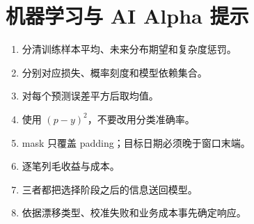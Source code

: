 \chapter{机器学习与 AI Alpha 提示}
\begin{enumerate}[leftmargin=*]
  \item 分清训练样本平均、未来分布期望和复杂度惩罚。
  \item 分别对应损失、概率刻度和模型依赖集合。
  \item 对每个预测误差平方后取均值。
  \item 使用 $(p-y)^2$，不要改用分类准确率。
  \item mask 只覆盖 padding；目标日期必须晚于窗口末端。
  \item 逐笔列毛收益与成本。
  \item 三者都把选择阶段之后的信息送回模型。
  \item 依据漂移类型、校准失败和业务成本事先确定响应。
\end{enumerate}
